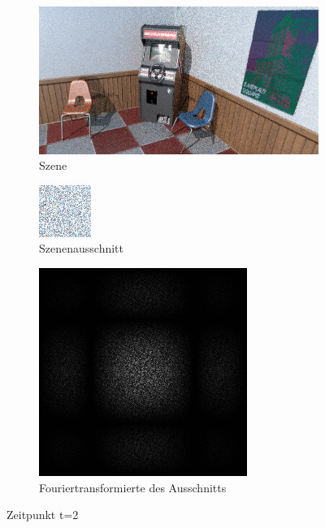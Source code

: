 \begin{figure}[H]
    \begin{subfigure}{\textwidth}
        \centering \includegraphics[scale=.25]{content/TemporalerAlg/Bilder/Retargeting/Screenshots/seed_debug_4.0_selection.png}
        \caption{Szene}
        \label{fig:Retargeting_And_Sorting_Szene_t2}
    \end{subfigure}
    \begin{subfigure}{0.5\textwidth}
        \centering\includegraphics[width=0.4\linewidth]{content/TemporalerAlg/Bilder/Retargeting/Screenshots/seed_debug_4.0_ausschnitt.png} 
        \caption{Szenenausschnitt}
        \label{fig:Retargeting_And_Sorting_ausschnitt_t2}
    \end{subfigure}
    \begin{subfigure}{0.5\textwidth}
        \centering\includegraphics[width=0.4\linewidth]{content/TemporalerAlg/Bilder/Retargeting/Screenshots/Spektren/seed_debug_4.0_ausschnitt.png}
        \caption{Fouriertransformierte des Ausschnitts}
        \label{fig:Retargeting_And_Sorting_Fouriertransformierte_t2}
    \end{subfigure}
        \caption{Zeitpunkt t=2}
        \label{fig:Retargeting_And_Sorting_Verlauf_t2}
\end{figure}

